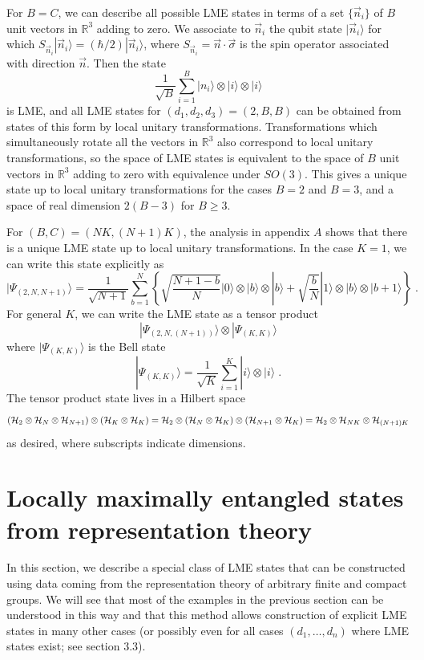 \documentclass[12pt]{article}
\theoremstyle{definition}
\newcommand{\be}{\begin{equation}}
\newcommand{\ee}{\end{equation}}
\begin{document}
For $B=C$, we can describe all possible LME states in terms of a set
$\{\vec{n}_i \}$ of $B$ unit vectors in $\mathbb{R}^3$ adding to zero. We
associate to $\vec{n}_i$ the qubit state $|\vec{n}_i \rangle$ for
which $S_{\vec{n}_i} |\vec{n}_i \rangle = (\hbar/2)|\vec{n}_i \rangle$, where $S_{\vec{n}_i} = \vec{n} \cdot \vec{\sigma}$ is the spin operator associated with direction $\vec{n}$. Then the state
\be \frac{1}{\sqrt{B}} \sum_{i=1}^B
|n_{i} \rangle  \otimes |i \rangle  \otimes |i \rangle \ee
is LME, and
all LME states for $(d_1,d_2,d_3) = (2,B,B)$ can be obtained from
states of this form by local unitary transformations. Transformations
which simultaneously rotate all the vectors in $\mathbb{R}^3$ also
correspond to local unitary transformations, so the space of LME
states is equivalent to the space of $B$ unit vectors in
$\mathbb{R}^3$ adding to zero with equivalence under $SO(3)$. This
gives a unique state up to local unitary transformations for the cases
$B=2$ and $B=3$, and a space of real dimension $2(B-3)$ for $B \ge 3$.

For $(B,C)=(NK,(N+1)K)$, the analysis in appendix $A$ shows that there is a unique LME state up to local unitary transformations. In the case $K=1$, we can write this state explicitly as
\be
|\Psi_{(2,N,N+1)} \rangle = \frac{1}{\sqrt{N+1}} \sum_{b=1}^N \left\{ \sqrt{\frac{N + 1 - b}{N}} |0 \rangle  \otimes  |b  \rangle  \otimes |b \rangle + \sqrt{\frac{b}{N}}  |1 \rangle  \otimes|b \rangle  \otimes |b+1 \rangle \right\} \; .
\ee
For general $K$, we can write the LME state as a tensor product
\be
|\Psi_{(2,N,(N+1))} \rangle  \otimes |\Psi_{(K,K)} \rangle
\ee
where $|\Psi_{(K,K)} \rangle$ is the Bell state
\be
|\Psi_{(K,K)} \rangle = \frac{1}{\sqrt{K}}  \sum_{i=1}^K  |i \rangle  \otimes  |i \rangle \; .
\ee
The tensor product state lives in a Hilbert space
\be
({\cal H}_2  \otimes {\cal H}_N  \otimes {\cal H}_{N+1})  \otimes ({\cal H}_K  \otimes {\cal H}_K) = {\cal H}_2  \otimes ({\cal H}_N  \otimes {\cal H}_K)  \otimes ({\cal H}_{N+1}  \otimes {\cal H}_K) = {\cal H}_2  \otimes {\cal H}_{NK}  \otimes {\cal H}_{(N+1)K}
\ee
as desired, where subscripts indicate dimensions.

\section{Locally maximally entangled states from representation theory}

In this section, we describe a special class of LME states that can be constructed using data coming from the representation theory of arbitrary finite and compact groups. We will see that most of the examples in the previous section can be understood in this way and that this method allows construction of explicit LME states in many other cases (or possibly even for all cases $(d_1, \dots, d_n)$ where LME states exist; see section 3.3).
\end{document}
